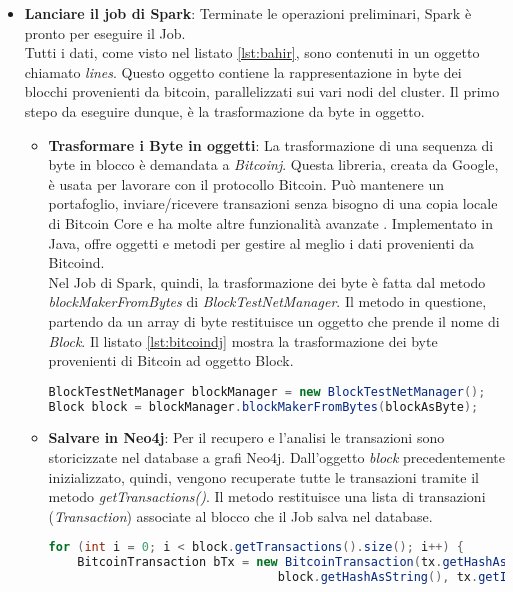 \begin{itemize}
\item \textbf{Lanciare il job di Spark}: Terminate le operazioni preliminari, Spark è pronto per eseguire il Job. 
\\Tutti i dati, come visto nel listato \ref{lst:bahir}, sono contenuti in un oggetto chiamato \textit{lines}. Questo oggetto contiene la rappresentazione in byte dei blocchi provenienti da bitcoin, parallelizzati sui vari nodi del cluster. Il primo stepo da eseguire dunque, è la trasformazione da byte in oggetto.
\begin{itemize}
\item \textbf{Trasformare i Byte in oggetti}: La trasformazione di una sequenza di byte in blocco è demandata a \textit{Bitcoinj}. Questa libreria, creata da Google, è usata per lavorare con il protocollo Bitcoin. Può mantenere un portafoglio, inviare/ricevere transazioni senza bisogno di una copia locale di Bitcoin Core e ha molte altre funzionalità avanzate \cite{bitcoinj:home}. Implementato in Java, offre oggetti e metodi per gestire al meglio i dati provenienti da Bitcoind. 
\\ Nel Job di Spark, quindi, la trasformazione dei byte è fatta dal metodo \textit{blockMakerFromBytes} di \textit{BlockTestNetManager}. Il metodo in questione, partendo da un array di byte restituisce un oggetto che prende il nome di \textit{Block}. Il listato \ref{lst:bitcoindj} mostra la trasformazione dei byte provenienti di Bitcoin ad oggetto Block. 
\begin{lstlisting}[language=Java, label=lst:bitcoindj, caption={Array di Byte trasformato in oggetto Block.}]
BlockTestNetManager blockManager = new BlockTestNetManager();
Block block = blockManager.blockMakerFromBytes(blockAsByte);
\end{lstlisting}
\item \textbf{Salvare in Neo4j}: Per il recupero e l'analisi le transazioni sono storicizzate nel database a grafi Neo4j. Dall'oggetto \textit{block} precedentemente inizializzato, quindi, vengono recuperate tutte le transazioni tramite il metodo \textit{getTransactions()}. Il metodo restituisce una lista di transazioni (\textit{Transaction}) associate al blocco che il Job salva nel database.
\begin{lstlisting}[language=Java, label=lst:saveNeo, caption={Prelievo transazioni e salvataggio in Neo4j.}]
for (int i = 0; i < block.getTransactions().size(); i++) {
	BitcoinTransaction bTx = new BitcoinTransaction(tx.getHashAsString(),
                                block.getHashAsString(), tx.getInputs(), tx.getOutputs(),

\end{lstlisting}
\end{itemize}
\end{itemize}
